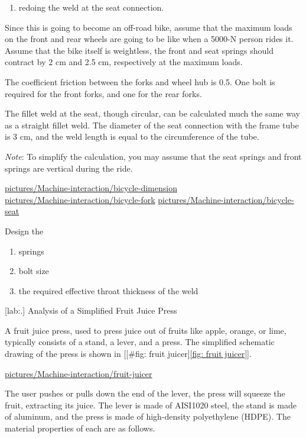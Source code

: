 \documentclass[a4paper,openany,12pt]{book}
\begin{document}
{{\begin{enumerate}
\item redoing the weld at the seat connection.
\end{enumerate}

Since this is going to become an off-road bike, assume that the maximum
loads on the front and rear wheels are going to be like when a 5000-N
person rides it. Assume that the bike itself is weightless, the front
and seat springs should contract by 2 cm and 2.5 cm, respectively at the
maximum loads.

The coefficient friction between the forks and wheel hub is 0.5. One
bolt is required for the front forks, and one for the rear forks.

The fillet weld at the seat, though circular, can be calculated much the
same way as a straight fillet weld. The diameter of the seat connection
with the frame tube is 3 cm, and the weld length is equal to the
circumference of the tube.

\emph{Note}: To simplify the calculation, you may assume that the seat
springs and front springs are vertical during the ride.

\url{pictures/Machine-interaction/bicycle-dimension}\\
\url{pictures/Machine-interaction/bicycle-fork}
\url{pictures/Machine-interaction/bicycle-seat}

Design the

\begin{enumerate}
\item springs

\item bolt size

\item the required effective throat thickness of the weld
\end{enumerate}

[lab:.]
Analysis of a Simplified Fruit Juice Press

A fruit juice press, used to press juice out of fruits like apple,
orange, or lime, typically consists of a stand, a lever, and a press.
The simplified schematic drawing of the press is shown in
[[\#fig: fruit juicer]\ref{fig: fruit juicer}].


\url{pictures/Machine-interaction/fruit-juicer}

The user pushes or pulls down the end of the lever, the press will
squeeze the fruit, extracting its juice. The lever is made of AISI1020
steel, the stand is made of aluminum, and the press is made of
high-density polyethylene (HDPE). The material properties of each are as
follows.


}}
\end{document}
